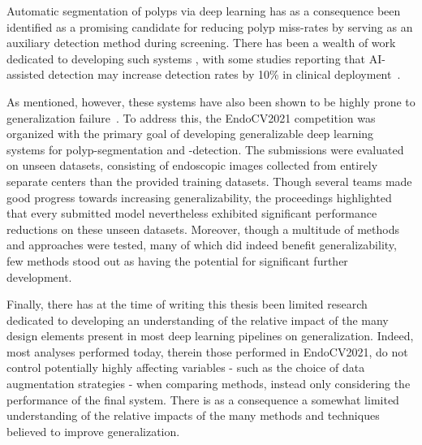    Automatic segmentation of polyps via deep learning has as a consequence been identified as a promising candidate for reducing polyp miss-rates by serving as an auxiliary detection method during screening. There has been a wealth of work dedicated to developing such systems \cite{endocv2020, endocv2021, ddanet}, with some studies reporting that AI-assisted detection may increase detection rates by 10\% in clinical deployment~\cite{polyp-success-story}.  
    
    As mentioned, however, these systems have also been shown to be highly prone to generalization failure~\cite{endocv2021}. To address this, the EndoCV2021 competition \cite{endocv2021} was organized with the primary goal of developing generalizable deep learning systems for polyp-segmentation and -detection. The submissions were evaluated on unseen datasets, consisting of endoscopic images collected from entirely separate centers than the provided training datasets. Though several teams made good progress towards increasing generalizability, the proceedings highlighted that every submitted model nevertheless exhibited significant performance reductions on these unseen datasets. Moreover, though a multitude of methods and approaches were tested, many of which did indeed benefit generalizability, few methods stood out as having the potential for significant further development.

    Finally, there has at the time of writing this thesis been limited research dedicated to developing an understanding of the relative impact of the many design elements present in most deep learning pipelines on generalization. Indeed, most analyses performed today, therein those performed in EndoCV2021, do not control potentially highly affecting variables - such as the choice of data augmentation strategies -  when comparing methods, instead only considering the performance of the final system. There is as a consequence a somewhat limited understanding of the relative impacts of the many methods and techniques believed to improve generalization.  
    
